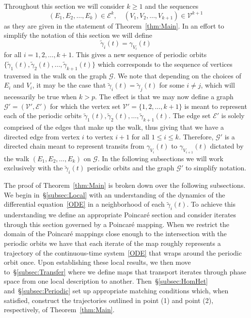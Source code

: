 \documentclass[11pt]{article}
\numberwithin{equation}{section}
\theoremstyle{plain}
\begin{document}
Throughout this section we will consider $k \geq 1$ and the sequences 
\begin{equation}
	(E_1,E_2,\dots,E_k) \in \mathcal{E}^k, \quad (V_1,V_2,\dots,V_{k+1})\in\mathcal{V}^{k+1}
\end{equation} 
as they are given in the statement of Theorem~\ref{thm:Main}. In an effort to simplify the notation of this section we will define 
\begin{equation}\label{tildegamma}
	\tilde{\gamma}_i(t) = \gamma_{V_i}(t)
\end{equation} 
for all $i = 1,2,\dots,k+1$. This gives a new sequence of periodic orbits $\{\tilde\gamma_1(t),\tilde\gamma_2(t),\dots,\tilde\gamma_{k+1}(t)\}$ which corresponds to the sequence of vertices traversed in the walk on the graph $\mathcal{G}$. We note that depending on the choices of $E_i$ and $V_i$, it may be the case that $\tilde{\gamma}_i(t) = \tilde{\gamma}_j(t)$ for some $i \neq j$, which will necessarily be true when $k > p$. The effect is that we may now define a graph $\mathcal{G}' = (\mathcal{V}',\mathcal{E}')$ for which the vertex set $\mathcal{V}' = \{1,2,\dots,k+1\}$ is meant to represent each of the periodic orbits $\tilde\gamma_1(t),\tilde\gamma_2(t),\dots,\tilde\gamma_{k+1}(t)$. The edge set $\mathcal{E}'$ is solely comprised of the edges that make up the walk, thus giving that we have a directed edge from vertex $i$ to vertex $i+1$ for all $1 \leq i \leq k$. Therefore, $\mathcal{G}'$ is a directed chain meant to represent transits from $\gamma_{V_i}(t)$ to $\gamma_{V_{i+1}}(t)$ dictated by the walk $(E_1,E_2,\dots,E_k)$ on $\mathcal{G}$. In the following subsections we will work exclusively with the $\tilde\gamma_i(t)$ periodic orbits and the graph $\mathcal{G}'$ to simplify notation.

The proof of Theorem~\ref{thm:Main} is broken down over the following subsections. We begin in~\S\ref{subsec:Local} with an understanding of the dynamics of the differential equation~\eqref{ODE} in a neighborhood of each $\tilde\gamma_i(t)$. To achieve this understanding we define an appropriate Poincar\'e section and consider iterates through this section governed by a Poincar\'e mapping. When we restrict the domain of the Poincar\'e mappings close enough to the intersection with the periodic orbits we have that each iterate of the map roughly represents a trajectory of the continuous-time system~\eqref{ODE} that wraps around the periodic orbit once. Upon establishing these local results, we then move to~\S\ref{subsec:Transfer} where we define maps that transport iterates through phase space from one local description to another. Then~\S\ref{subsec:HomHet} and~\S\ref{subsec:Periodic} set up appropriate matching conditions which, when satisfied, construct the trajectories outlined in point (1) and point (2), respectively, of Theorem~\ref{thm:Main}. 
\end{document}
